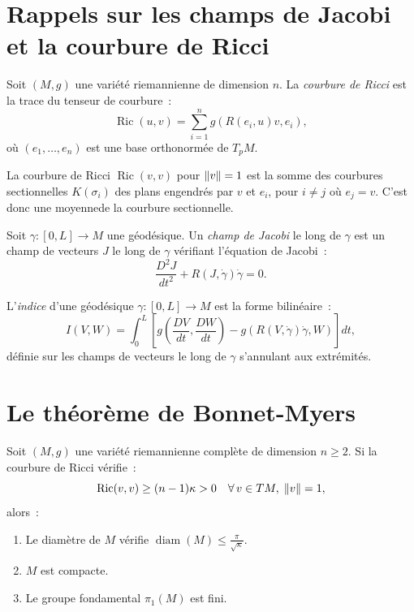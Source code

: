 \section{Rappels sur les champs de Jacobi et la courbure de Ricci}

\begin{definition}
Soit $(M, g)$ une vari\'et\'e riemannienne de dimension $n$. La \emph{courbure de Ricci}
est la trace du tenseur de courbure~:
\[
    \operatorname{Ric}(u, v) = \sum_{i=1}^{n} g(R(e_i, u)v, e_i),
\]
o\`u $(e_1, \ldots, e_n)$ est une base orthonorm\'ee de $T_pM$.
\end{definition}

\begin{remarque}
La courbure de Ricci $\operatorname{Ric}(v, v)$ pour $\left\| v \right\| = 1$ est la somme
des courbures sectionnelles $K(\sigma_i)$ des plans engendr\'es par $v$ et $e_i$,
pour $i \neq j$ o\`u $e_j = v$. C'est donc une \og{}moyenne\fg de la courbure sectionnelle.
\end{remarque}

\begin{definition}
Soit $\gamma : [0, L] \to M$ une g\'eod\'esique. Un \emph{champ de Jacobi} le long
de $\gamma$ est un champ de vecteurs $J$ le long de $\gamma$ v\'erifiant
l'\'equation de Jacobi~:
\[
    \frac{D^2 J}{dt^2} + R(J, \dot{\gamma})\dot{\gamma} = 0.
\]
\end{definition}

\begin{proposition}
\label{prop:indice_jacobi}
L'\emph{indice} d'une g\'eod\'esique $\gamma : [0, L] \to M$ est la forme bilin\'eaire~:
\[
    I(V, W) = \int_0^L \left[ g\!\left(\frac{DV}{dt}, \frac{DW}{dt}\right)
    - g(R(V, \dot{\gamma})\dot{\gamma}, W) \right] dt,
\]
d\'efinie sur les champs de vecteurs le long de $\gamma$ s'annulant aux extr\'emit\'es.
\end{proposition}

\section{Le th\'eor\`eme de Bonnet-Myers}

\begin{theoreme}
\label{thm:bonnet_myers}
Soit $(M, g)$ une vari\'et\'e riemannienne compl\`ete de dimension $n \geq 2$.
Si la courbure de Ricci v\'erifie~:
\[
    \operatorname{Ric}(v, v) \geq (n-1)\kappa > 0
    \quad \forall\, v \in TM,\; \left\| v \right\| = 1,
\]
alors~:
\begin{enumerate}
    \item Le diam\`etre de $M$ v\'erifie $\operatorname{diam}(M) \leq \frac{\pi}{\sqrt{\kappa}}$.
    \item $M$ est compacte.
    \item Le groupe fondamental $\pi_1(M)$ est fini.
\end{enumerate}
\end{theoreme}

